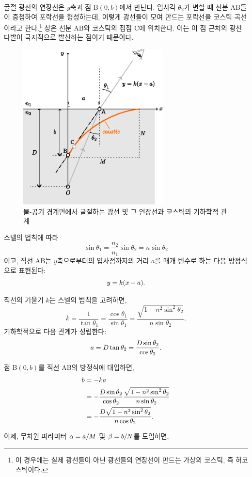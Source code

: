 \documentclass[twocolumn]{article}
\begin{document}
굴절 광선의 연장선은 $y$축과 점 B$(0, b)$에서 만난다. 입사각 $\theta_2$가 변할 때 선분 ${\mathrm{AB}}$들이 중첩하여 포락선을 형성하는데, 이렇게 광선들이 모여 만드는 포락선을 코스틱 곡선이라고 한다.\footnote{이 경우에는 실제 광선들이 아닌 광선들의 연장선이 만드는 가상의 코스틱, 즉 허코스틱이다.} 상은 선분 ${\mathrm{AB}}$와 코스틱의 접점 $\mathrm{C}$에 위치한다.  이는 이 점 근처의 광선 다발이 국지적으로 발산하는 점이기 때문이다. 

\begin{figure}
	\centering
	\includegraphics[width=3in]{figs/g237.eps}
	\caption{물-공기 경계면에서 굴절하는 광선 및 그 연장선과 코스틱의 기하학적 관계}
	\label{fig:geometry}
\end{figure}

스넬의 법칙에 따라
$$ \sin\theta_1 = \frac{n_2}{n_1} \sin\theta_2 = n\sin\theta_2$$
이고,  직선 AB는 $y$축으로부터의 입사점까지의 거리 $a$를 매개 변수로 하는 다음 방정식으로 표현된다:
$$y=k(x-{a}).$$

직선의 기울기 $k$는 스넬의 법칙을 고려하면,
$$k=\dfrac{1}{\tan\theta_1}=\dfrac{\cos\theta_1}{\sin\theta_1}
	=\dfrac{\sqrt{1-n^2\sin^2\theta_2}}{n\sin\theta_2}.$$
기하학적으로 다음 관계가 성립한다:
$${a} = D\tan\theta_2 = \dfrac{D\sin\theta_2}{\cos\theta_2}.$$

점 B$(0, b)$를 직선 AB의 방정식에 대입하면,
$$\begin{aligned}
	{b} &= -k{a} \\
	&= -\dfrac{D\sin\theta_2}{\cos\theta_2}
	\dfrac{\sqrt{1-n^2\sin^2\theta_2}}{n\sin\theta_2}\\
	&=-\dfrac{D\sqrt{1-n^2\sin^2\theta_2}}{n\cos\theta_2}.
\end{aligned}$$

이제, 무차원 파라미터 ${\alpha}={a}/M$ 및 ${\beta}={b}/N$를 도입하면,
\end{document}
